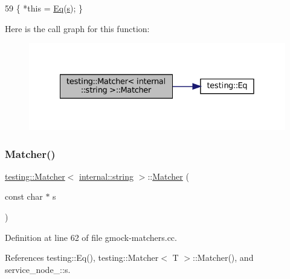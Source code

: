 \begin{DoxyCode}
59 \{ *\textcolor{keyword}{this} = \hyperlink{namespacetesting_a0cb8ba7eae844c871eccb29e7c81635f}{Eq}(\hyperlink{namespaceservice__node__3_aa976421a49e0b54f23833423400849ae}{s}); \}
\end{DoxyCode}
Here is the call graph for this function\+:
\nopagebreak
\begin{figure}[H]
\begin{center}
\leavevmode
\includegraphics[width=328pt]{classtesting_1_1Matcher_3_01internal_1_1string_01_4_ae2d21038e4dcc25776187d8bff1665f3_cgraph}
\end{center}
\end{figure}
\mbox{\label{classtesting_1_1Matcher_3_01internal_1_1string_01_4_a65f1d7616edb049ac059ad5d3fa2d625}} 
\subsubsection{\texorpdfstring{Matcher()}{Matcher()}\hspace{0.1cm}{\footnotesize\ttfamily [4/4]}}
{\footnotesize\ttfamily \hyperlink{classtesting_1_1Matcher}{testing\+::\+Matcher}$<$ \hyperlink{namespacetesting_1_1internal_a8e8ff5b11e64078831112677156cb111}{internal\+::string} $>$\+::\hyperlink{classtesting_1_1Matcher}{Matcher} (\begin{DoxyParamCaption}\item[{const char $\ast$}]{s }\end{DoxyParamCaption})}



Definition at line 62 of file gmock-\/matchers.\+cc.



References testing\+::\+Eq(), testing\+::\+Matcher$<$ T $>$\+::\+Matcher(), and service\+\_\+node\+\_\+::s.


